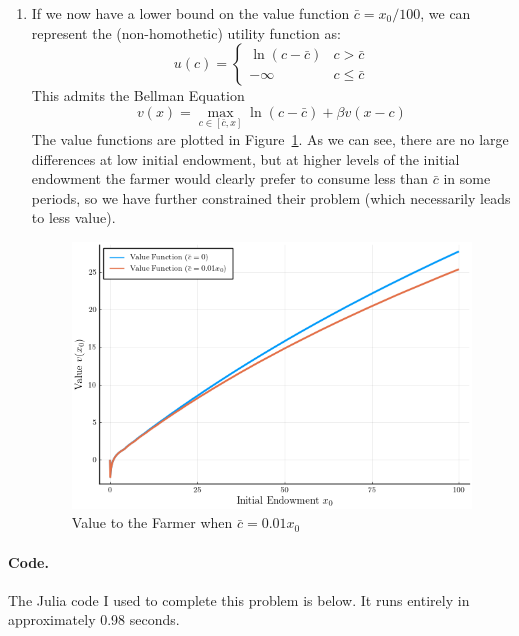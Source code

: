 \documentclass[10pt]{article}
\begin{document}
\begin{enumerate}
	\item If we now have a lower bound on the value function $\bar{c} = x_0 / 100$, we can represent the (non-homothetic) utility function as: \[u(c) = \begin{cases} \ln(c - \bar{c}) & c >\bar{c} \\ -\infty & c \le \bar{c}\end{cases}\]This admits the Bellman Equation \[v(x) = \max_{c \in [\bar{c},x]} \ln(c-\bar{c}) + \beta v(x - c)\]The value functions are plotted in Figure~\ref{fig:value_subs}. As we can see, there are no large differences at low initial endowment, but at higher levels of the initial endowment the farmer would clearly prefer to consume less than $\bar{c}$ in some periods, so we have further constrained their problem (which necessarily leads to less value). \begin{figure}[H] \centering \includegraphics{macro_hw3_code/value_function_subsistence.png} \caption{Value to the Farmer when $\bar{c} = 0.01 x_0$} \label{fig:value_subs}\end{figure}
\end{enumerate}


\paragraph{Code.} The Julia code I used to complete this problem is below. It runs entirely in approximately 0.98 seconds.



\end{document}
